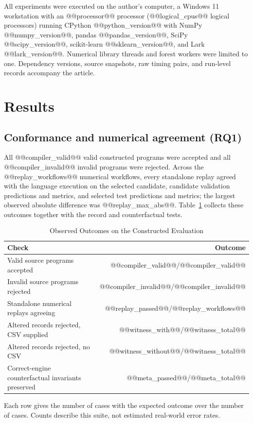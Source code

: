 \documentclass[lettersize,journal]{IEEEtran}
\begin{document}
All experiments were executed on the author's computer, a Windows 11 workstation with an @@processor@@ processor (@@logical_cpus@@ logical processors) running CPython @@python_version@@ with NumPy @@numpy_version@@, pandas @@pandas_version@@, SciPy @@scipy_version@@, scikit-learn @@sklearn_version@@, and Lark @@lark_version@@. Numerical library threads and forest workers were limited to one. Dependency versions, source snapshots, raw timing pairs, and run-level records accompany the article.

\section{Results}
\subsection{Conformance and numerical agreement (RQ1)}
All @@compiler_valid@@ valid constructed programs were accepted and all @@compiler_invalid@@ invalid programs were rejected. Across the @@replay_workflows@@ numerical workflows, every standalone replay agreed with the language execution on the selected candidate, candidate validation predictions and metrics, and selected test predictions and metrics; the largest observed absolute difference was @@replay_max_abs@@. Table~\ref{tab:outcomes} collects these outcomes together with the record and counterfactual tests.

\begin{table}[t]
\caption{Observed Outcomes on the Constructed Evaluation}
\label{tab:outcomes}\centering\footnotesize
\begin{tabular}{p{}r}\toprule
Check & Outcome\\\midrule
Valid source programs accepted & @@compiler_valid@@/@@compiler_valid@@\\
Invalid source programs rejected & @@compiler_invalid@@/@@compiler_invalid@@\\
Standalone numerical replays agreeing & @@replay_passed@@/@@replay_workflows@@\\
Altered records rejected, CSV supplied & @@witness_with@@/@@witness_total@@\\
Altered records rejected, no CSV & @@witness_without@@/@@witness_total@@\\
Correct-engine counterfactual invariants preserved & @@meta_passed@@/@@meta_total@@\\\bottomrule
\end{tabular}

\smallskip
\parbox{0.95\columnwidth}{\footnotesize Each row gives the number of cases with the expected outcome over the number of cases. Counts describe this suite, not estimated real-world error rates.}
\end{table}
\end{document}
